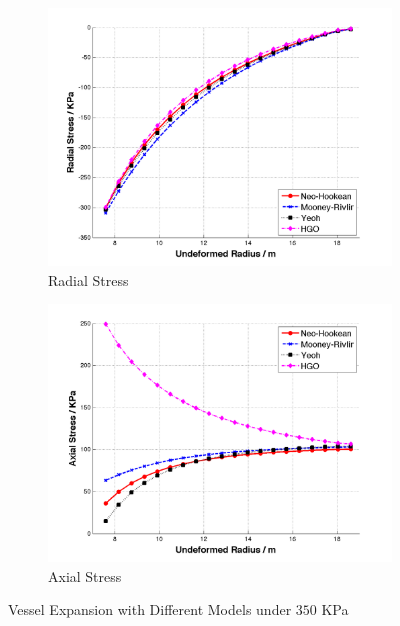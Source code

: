 \begin{figure}[H]
	\begin{subfigure}[b]{0.5\textwidth}
		\centering
		\includegraphics[width=\textwidth]{./figures/radial_models.png}
		\caption{Radial Stress}
		\label{radial_models}
	\end{subfigure}
	\begin{subfigure}[b]{0.5\textwidth}
		\centering
		\includegraphics[width=\textwidth]{./figures/axial_models.png}
		\caption{Axial Stress}
		\label{axial_models}
	\end{subfigure}
	\caption{Vessel Expansion with Different Models under $350$ KPa}
	\label{fig:models}
\end{figure}

